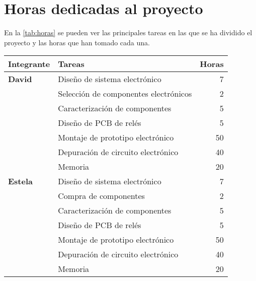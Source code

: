 \section{Horas dedicadas al proyecto}
En la \autoref{tab:horas} se pueden ver las principales tareas en las que se ha dividido el proyecto y las horas que han tomado cada una.
\begin{table}[H]
    \centering
    \begin{tabular}[c]{llr}
        \toprule
        \textbf{Integrante} & \textbf{Tareas} & \multicolumn{1}{c}{\textbf{Horas}} \\ \midrule

        \textbf{David}      & Diseño de sistema electrónico         & 7 \\
                            & Selección de componentes electrónicos & 2 \\ 
                            & Caracterización de componentes        & 5 \\
                            & Diseño de PCB de relés                & 5 \\
                            & Montaje de prototipo electrónico      & 50 \\ 
                            & Depuración de circuito electrónico    & 40 \\
                            & Memoria                               & 20 \\
                            \midrule

        \textbf{Estela}     & Diseño de sistema electrónico         & 7 \\
                            & Compra de componentes                 & 2 \\
                            & Caracterización de componentes        & 5 \\
                            & Diseño de PCB de relés                & 5 \\
                            & Montaje de prototipo electrónico      & 50 \\ 
                            & Depuración de circuito electrónico    & 40 \\
                            & Memoria                               & 20 \\
                            \midrule


\end{tabular}
\end{table}
